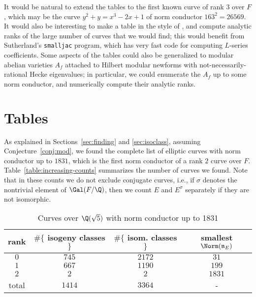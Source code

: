 \documentclass{amsart}
\newcommand{\n}{\mathfrak{n}}
\begin{document}
It would be natural to extend the tables to the first known curve of
rank $3$ over $F$, which may be the curve $y^2 + y = x^3 -2x + 1$ of
norm conductor $163^2=26569$.  It would also be interesting to make a
table in the style of \cite{stein-watkins:ants5}, and compute analytic
ranks of the large number of curves that we would find; this would
benefit from Sutherland's {\tt smalljac} program, which has very fast code
for computing $L$-series coefficients.  Some aspects of the tables
could also be generalized to modular abelian varieties $A_f$ attached
to Hilbert modular newforms with not-necessarily-rational Hecke
eigenvalues; in particular, we could enumerate the $A_f$ up to some
norm conductor, and numerically compute their analytic ranks.

\section{Tables}\label{sec:tables}

As explained in Sections~\ref{sec:finding} and \ref{sec:isoclass},
assuming Conjecture~\ref{conj:mod}, we found the complete list of
elliptic curves with norm conductor up to $1831$, which is the first
norm conductor of a rank $2$ curve over $F$.  Table~\ref{table:increasing-counts}
summarizes the number of curves we found.  Note that in these counts
we do not exclude conjugate curves, i.e., if $\sigma$ denotes the
nontrivial element of $\Gal(F/\Q)$, then we count $E$ and $E^{\sigma}$
separately if they are not isomorphic.  

\begin{center}
\begin{table}
\caption{Curves over $\Q(\sqrt{5})$ with norm conductor up to 1831\label{table:total-counts}}
\begin{tabular}{|c|c|c|c|}\hline
{\bf rank} & $\#\{${\bf{} isogeny classes }$\}$ &  $\#\{${\bf{} isom. classes }$\}$ &{\bf smallest $\Norm(\n_E)$} \\\hline
 $0$  & $745$  & $2172$ & $31$\\\hline
 $1$  & $667$  & $1190$ & $199$ \\\hline
 $2$  & $2$    & $2$    & $1831$ \\\hline
total & $1414$ & $3364$ & - \\\hline
\end{tabular}
\end{table}
\end{center}
\end{document}

